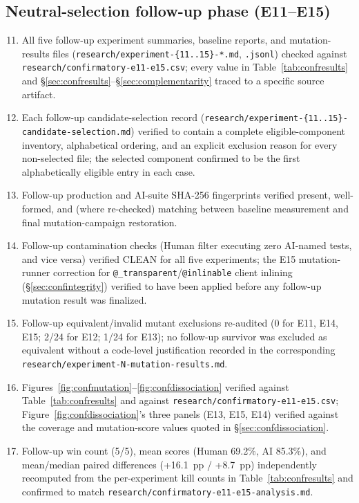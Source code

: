 \documentclass[10pt,conference]{IEEEtran}
\begin{document}
\subsection{Neutral-selection follow-up phase (E11--E15)}
\begin{enumerate}
\setcounter{enumi}{10}
\item All five follow-up experiment summaries, baseline reports, and mutation-results files (\texttt{research/experiment-\{11..15\}-*.md}, \texttt{.jsonl}) checked against \texttt{research/confirmatory-e11-e15.csv}; every value in Table~\ref{tab:confresults} and \S\ref{sec:confresults}--\S\ref{sec:complementarity} traced to a specific source artifact.
\item Each follow-up candidate-selection record (\texttt{research/experiment-\{11..15\}-candidate-selection.md}) verified to contain a complete eligible-component inventory, alphabetical ordering, and an explicit exclusion reason for every non-selected file; the selected component confirmed to be the first alphabetically eligible entry in each case.
\item Follow-up production and AI-suite SHA-256 fingerprints verified present, well-formed, and (where re-checked) matching between baseline measurement and final mutation-campaign restoration.
\item Follow-up contamination checks (Human filter executing zero AI-named tests, and vice versa) verified CLEAN for all five experiments; the E15 mutation-runner correction for \texttt{@\_transparent}/\texttt{@inlinable} client inlining (\S\ref{sec:confintegrity}) verified to have been applied before any follow-up mutation result was finalized.
\item Follow-up equivalent/invalid mutant exclusions re-audited (0 for E11, E14, E15; 2/24 for E12; 1/24 for E13); no follow-up survivor was excluded as equivalent without a code-level justification recorded in the corresponding \texttt{research/experiment-N-mutation-results.md}.
\item Figures~\ref{fig:confmutation}--\ref{fig:confdissociation} verified against Table~\ref{tab:confresults} and against \texttt{research/confirmatory-e11-e15.csv}; Figure~\ref{fig:confdissociation}'s three panels (E13, E15, E14) verified against the coverage and mutation-score values quoted in \S\ref{sec:confdissociation}.
\item Follow-up win count (5/5), mean scores (Human 69.2\%, AI 85.3\%), and mean/median paired differences (+16.1~pp / +8.7~pp) independently recomputed from the per-experiment kill counts in Table~\ref{tab:confresults} and confirmed to match \texttt{research/confirmatory-e11-e15-analysis.md}.

\end{enumerate}
\end{document}
